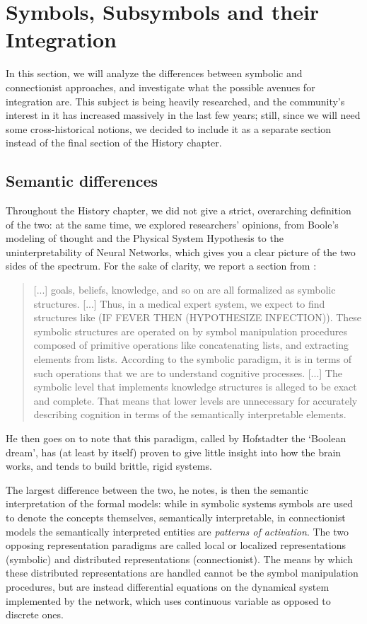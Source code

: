 \documentclass[../main.tex]{subfiles}
\begin{document}
\section{Symbols, Subsymbols and their Integration}

In this section, we will analyze the differences between symbolic and connectionist approaches, and investigate what the possible avenues for integration are. This subject is being heavily researched, and the community's interest in it has increased massively in the last few years; still, since we will need some cross-historical notions, we decided to include it as a separate section instead of the final section of the History chapter.

\subsection{Semantic differences}
Throughout the History chapter, we did not give a strict, overarching definition of the two: at the same time, we explored researchers' opinions, from Boole's modeling of thought and the Physical System Hypothesis to the uninterpretability of Neural Networks, which gives you a clear picture of the two sides of the spectrum. For the sake of clarity, we report a section from \cite{smolenskyConnectionistAISymbolic1987}:
\begin{quote}
    [...] goals, beliefs, knowledge, and so on are all formalized as symbolic structures. [...] Thus, in a medical expert system, we expect to find structures like (IF FEVER THEN (HYPOTHESIZE INFECTION)). These symbolic structures are operated on by symbol manipulation procedures composed of primitive operations like concatenating lists, and extracting elements from lists. According to the symbolic paradigm, it is in terms of such operations that we are to understand cognitive processes. [...] The symbolic level that implements knowledge structures is alleged to be exact and complete. That means that lower levels are unnecessary for accurately describing cognition in terms of the semantically interpretable elements.
\end{quote}

He then goes on to note that this paradigm, called by Hofstadter the `Boolean dream', has (at least by itself) proven to give little insight into how the brain works, and tends to build brittle, rigid systems.

The largest difference between the two, he notes, is then the semantic interpretation of the formal models: while in symbolic systems symbols are used to denote the concepts themselves, semantically interpretable, in connectionist models the semantically interpreted entities are \textit{patterns of activation}. The two opposing representation paradigms are called local or localized representations (symbolic) and distributed representations (connectionist). The means by which these distributed representations are handled cannot be the symbol manipulation procedures, but are instead differential equations on the dynamical system implemented by the network, which uses continuous variable as opposed to discrete ones.
\end{document}

